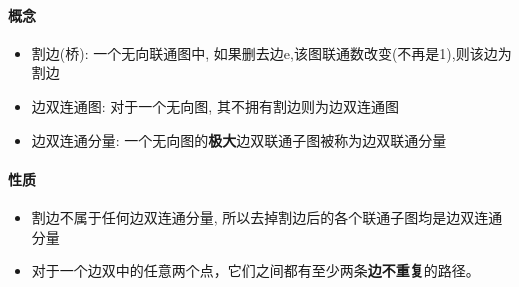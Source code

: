 \paragraph{概念}

\begin{itemize}
    \item 割边(桥): 一个无向联通图中, 如果删去边e,该图联通数改变(不再是1),则该边为割边
    \item 边双连通图: 对于一个无向图, 其不拥有割边则为边双连通图
    \item 边双连通分量: 一个无向图的\textbf{极大}边双联通子图被称为边双联通分量
\end{itemize}

\paragraph{性质}

\begin{itemize}
    \item 割边不属于任何边双连通分量, 所以去掉割边后的各个联通子图均是边双连通分量
    \item 对于一个边双中的任意两个点，它们之间都有至少两条\textbf{边不重复}的路径。
\end{itemize}